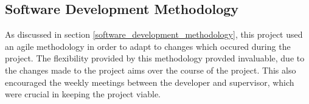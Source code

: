 







%






\subsection{Software Development Methodology}
As discussed in section \ref{software_development_methodology}, this project used an agile methodology in order to adapt to changes which occured during the project. The flexibility provided by this methodology provded invaluable, due to the changes made to the project aims over the course of the project. This also encouraged the weekly meetings between the developer and supervisor, which were crucial in keeping the project viable.



